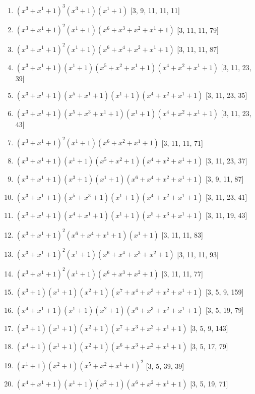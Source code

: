 \documentclass[10pt,twocolumn]{article}
\begin{document}
\begin{enumerate}
\item $(x^{3} + x^{1} + 1)^{3}(x^{3} + 1)(x^{1} + 1)$  [3, 9, 11, 11, 11]
\item $(x^{3} + x^{1} + 1)^{2}(x^{1} + 1)(x^{6} + x^{3} + x^{2} + x^{1} + 1)$  [3, 11, 11, 79]
\item $(x^{3} + x^{1} + 1)^{2}(x^{1} + 1)(x^{6} + x^{4} + x^{2} + x^{1} + 1)$  [3, 11, 11, 87]
\item $(x^{3} + x^{1} + 1)(x^{1} + 1)(x^{5} + x^{2} + x^{1} + 1)(x^{4} + x^{2} + x^{1} + 1)$  [3, 11, 23, 39]
\item $(x^{3} + x^{1} + 1)(x^{5} + x^{1} + 1)(x^{1} + 1)(x^{4} + x^{2} + x^{1} + 1)$  [3, 11, 23, 35]
\item $(x^{3} + x^{1} + 1)(x^{5} + x^{3} + x^{1} + 1)(x^{1} + 1)(x^{4} + x^{2} + x^{1} + 1)$  [3, 11, 23, 43]
\item $(x^{3} + x^{1} + 1)^{2}(x^{1} + 1)(x^{6} + x^{2} + x^{1} + 1)$  [3, 11, 11, 71]
\item $(x^{3} + x^{1} + 1)(x^{1} + 1)(x^{5} + x^{2} + 1)(x^{4} + x^{2} + x^{1} + 1)$  [3, 11, 23, 37]
\item $(x^{3} + x^{1} + 1)(x^{3} + 1)(x^{1} + 1)(x^{6} + x^{4} + x^{2} + x^{1} + 1)$  [3, 9, 11, 87]
\item $(x^{3} + x^{1} + 1)(x^{5} + x^{3} + 1)(x^{1} + 1)(x^{4} + x^{2} + x^{1} + 1)$  [3, 11, 23, 41]
\item $(x^{3} + x^{1} + 1)(x^{4} + x^{1} + 1)(x^{1} + 1)(x^{5} + x^{3} + x^{1} + 1)$  [3, 11, 19, 43]
\item $(x^{3} + x^{1} + 1)^{2}(x^{6} + x^{4} + x^{1} + 1)(x^{1} + 1)$  [3, 11, 11, 83]
\item $(x^{3} + x^{1} + 1)^{2}(x^{1} + 1)(x^{6} + x^{4} + x^{3} + x^{2} + 1)$  [3, 11, 11, 93]
\item $(x^{3} + x^{1} + 1)^{2}(x^{1} + 1)(x^{6} + x^{3} + x^{2} + 1)$  [3, 11, 11, 77]
\item $(x^{3} + 1)(x^{1} + 1)(x^{2} + 1)(x^{7} + x^{4} + x^{3} + x^{2} + x^{1} + 1)$  [3, 5, 9, 159]
\item $(x^{4} + x^{1} + 1)(x^{1} + 1)(x^{2} + 1)(x^{6} + x^{3} + x^{2} + x^{1} + 1)$  [3, 5, 19, 79]
\item $(x^{3} + 1)(x^{1} + 1)(x^{2} + 1)(x^{7} + x^{3} + x^{2} + x^{1} + 1)$  [3, 5, 9, 143]
\item $(x^{4} + 1)(x^{1} + 1)(x^{2} + 1)(x^{6} + x^{3} + x^{2} + x^{1} + 1)$  [3, 5, 17, 79]
\item $(x^{1} + 1)(x^{2} + 1)(x^{5} + x^{2} + x^{1} + 1)^{2}$  [3, 5, 39, 39]
\item $(x^{4} + x^{1} + 1)(x^{1} + 1)(x^{2} + 1)(x^{6} + x^{2} + x^{1} + 1)$  [3, 5, 19, 71]

\end{enumerate}
\end{document}
